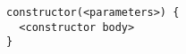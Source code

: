 \begin{lstlisting}[language=Solidity]
constructor(<parameters>) {
  <constructor body>
}
\end{lstlisting}